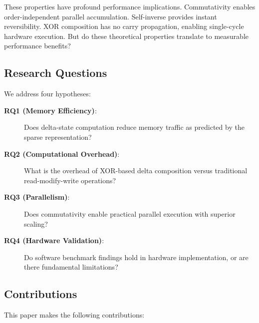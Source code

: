 \documentclass[11pt,letterpaper]{article}
\theoremstyle{plain}
\theoremstyle{definition}
\theoremstyle{remark}
\begin{document}
These properties have profound performance implications. Commutativity enables order-independent parallel accumulation. Self-inverse provides instant reversibility. XOR composition has no carry propagation, enabling single-cycle hardware execution. But do these theoretical properties translate to measurable performance benefits?

\subsection{Research Questions}

We address four hypotheses:

\begin{description}
    \item[\textbf{RQ1 (Memory Efficiency)}:] Does delta-state computation reduce memory traffic as predicted by the sparse representation?

    \item[\textbf{RQ2 (Computational Overhead)}:] What is the overhead of XOR-based delta composition versus traditional read-modify-write operations?

    \item[\textbf{RQ3 (Parallelism)}:] Does commutativity enable practical parallel execution with superior scaling?

    \item[\textbf{RQ4 (Hardware Validation)}:] Do software benchmark findings hold in hardware implementation, or are there fundamental limitations?
\end{description}

\subsection{Contributions}

This paper makes the following contributions:
\end{document}
